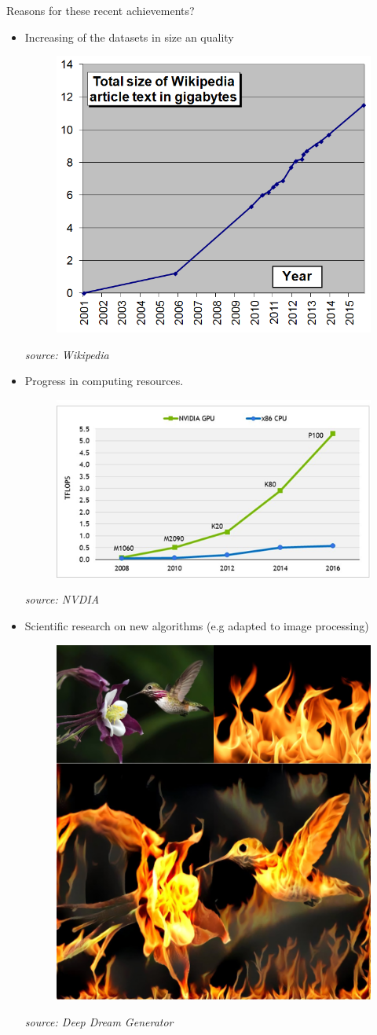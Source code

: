 \documentclass[handout]{beamer}
\newcommand{\rref}[1][]{\hfill{\scriptsize\textit{#1}}}
\begin{document}
\begin{frame}[t]{Reasons for these recent achievements?}
    \begin{itemize}
        \item Increasing of the datasets in size an quality
         {
        \begin{figure}
\includegraphics[width=.6\textwidth]{fig/L1/Wikipedia_article_size_in_gigabytes.png}
\end{figure}
\rref[source: Wikipedia]
}
        \item <2-> Progress in computing resources.
         {
        \begin{figure}
\includegraphics[width=.7\textwidth]{fig/L1/evolution-gpu.png}
\end{figure}
\rref[source: NVDIA]
}        
        
        \item <3-> Scientific research on new algorithms (e.g adapted to image processing)
                 {
        \begin{figure}
\includegraphics[width=.4\textwidth]{fig/L1/deep-art.jpg}
\end{figure}
\rref[source: Deep Dream Generator]

}        
    \end{itemize}

\end{frame}
\end{document}
